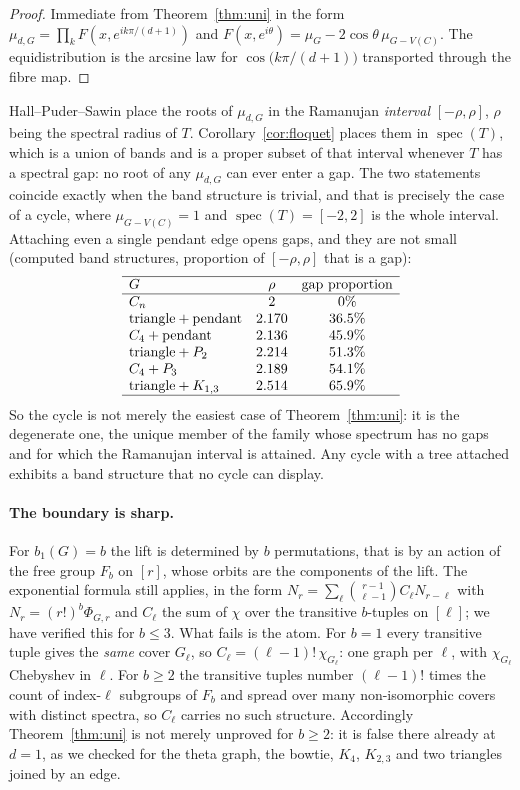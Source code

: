 \documentclass[11pt]{article}
\theoremstyle{remark}
\begin{document}
\begin{proof}
Immediate from Theorem~\ref{thm:uni} in the form
$\mu_{d,G}=\prod_{k}F(x,e^{ik\pi/(d+1)})$ and
$F(x,e^{i\theta})=\mu_G-2\cos\theta\,\mu_{G-V(C)}$. The equidistribution is the
arcsine law for $\cos\bigl(k\pi/(d+1)\bigr)$ transported through the fibre map.
\end{proof}

Hall--Puder--Sawin place the roots of $\mu_{d,G}$ in the Ramanujan
\emph{interval} $[-\rho,\rho]$, $\rho$ being the spectral radius of $T$.
Corollary~\ref{cor:floquet} places them in $\operatorname{spec}(T)$, which is a
union of bands and is a proper subset of that interval whenever $T$ has a
spectral gap: no root of any $\mu_{d,G}$ can ever enter a gap. The two
statements coincide exactly when the band structure is trivial, and that is
precisely the case of a cycle, where $\mu_{G-V(C)}=1$ and
$\operatorname{spec}(T)=[-2,2]$ is the whole interval. Attaching even a single
pendant edge opens gaps, and they are not small (computed band structures,
proportion of $[-\rho,\rho]$ that is a gap):
\[
\begin{array}{lcc}
\hline
G & \rho & \text{gap proportion}\\
\hline
C_n & 2 & 0\%\\
\text{triangle}+\text{pendant} & 2.170 & 36.5\%\\
C_4+\text{pendant} & 2.136 & 45.9\%\\
\text{triangle}+P_2 & 2.214 & 51.3\%\\
C_4+P_3 & 2.189 & 54.1\%\\
\text{triangle}+K_{1,3} & 2.514 & 65.9\%\\
\hline
\end{array}
\]
So the cycle is not merely the easiest case of Theorem~\ref{thm:uni}: it is the
degenerate one, the unique member of the family whose spectrum has no gaps and
for which the Ramanujan interval is attained. Any cycle with a tree attached
exhibits a band structure that no cycle can display.

\paragraph{The boundary is sharp.}
For $b_1(G)=b$ the lift is determined by $b$ permutations, that is by an action
of the free group $F_b$ on $[r]$, whose orbits are the components of the lift.
The exponential formula still applies, in the form
$N_r=\sum_{\ell}\binom{r-1}{\ell-1}C_\ell N_{r-\ell}$ with
$N_r=(r!)^{b}\Phi_{G,r}$ and $C_\ell$ the sum of $\chi$ over the transitive
$b$-tuples on $[\ell]$; we have verified this for $b\le3$. What fails is the
atom. For $b=1$ every transitive tuple gives the \emph{same} cover $G_\ell$, so
$C_\ell=(\ell-1)!\,\chi_{G_\ell}$: one graph per $\ell$, with $\chi_{G_\ell}$
Chebyshev in $\ell$. For $b\ge2$ the transitive tuples number $(\ell-1)!$ times
the count of index-$\ell$ subgroups of $F_b$ and spread over many
non-isomorphic covers with distinct spectra, so $C_\ell$ carries no such
structure. Accordingly Theorem~\ref{thm:uni} is not merely unproved for
$b\ge2$: it is false there already at $d=1$, as we checked for the theta graph,
the bowtie, $K_4$, $K_{2,3}$ and two triangles joined by an edge.
\end{document}
